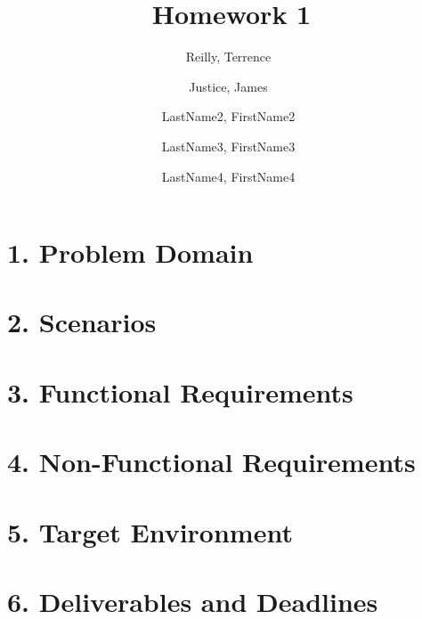 \documentclass[a4paper,12pt]{article}
\author{
    Reilly, Terrence\
    \and
    Justice, James\
    \and
    LastName2, FirstName2\
    \and
    LastName3, FirstName3\
    \and
    LastName4, FirstName4\
}
\title{Homework 1}
\begin{document}
    \maketitle

    \section*{1. Problem Domain}
        

    \section*{2. Scenarios}
        

    \section*{3. Functional Requirements}
        

    \section*{4. Non-Functional Requirements}
        

    \section*{5. Target Environment}
        

    \section*{6. Deliverables and Deadlines}
        
\end{document}
